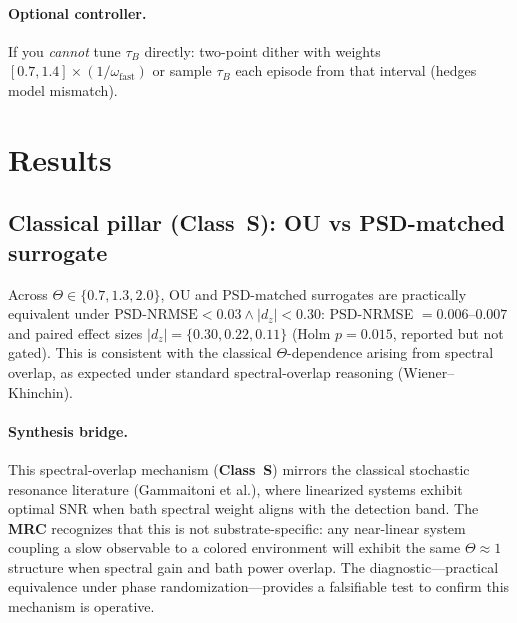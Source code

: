 \documentclass[11pt,letterpaper]{article}
\DeclareRobustCommand{\mrc}{\textbf{MRC}\xspace}
\DeclareRobustCommand{\classS}{\textbf{Class~S}\xspace}
\DeclareRobustCommand{\GatePSD}{\ensuremath{\text{PSD-NRMSE}<0.03}\xspace}
\DeclareRobustCommand{\GateDZ}{\ensuremath{\lvert d_z\rvert<0.30}\xspace}
\DeclareRobustCommand{\GateEQ}{\ensuremath{\GatePSD \wedge \GateDZ}\xspace}
\begin{document}
\begin{tcolorbox}[colback=blue!5!white,colframe=blue!75!black,title=Design Card: Memory-Resonance Condition ($\Theta \approx 1$)]
\paragraph*{Optional controller.}
If you \emph{cannot} tune $\tau_B$ directly: two-point dither with weights $[0.7, 1.4]\times(1/\omega_{\mathrm{fast}})$ or sample $\tau_B$ each episode from that interval (hedges model mismatch).

\end{tcolorbox}

\section{Results}
\subsection{Classical pillar (\classS): OU vs PSD-matched surrogate}
Across $\Theta\in\{0.7,1.3,2.0\}$, OU and PSD-matched surrogates are practically equivalent under \GateEQ: PSD-NRMSE $=0.006$--$0.007$ and paired effect sizes $|d_z|=\{0.30,0.22,0.11\}$ (Holm $p=0.015$, reported but not gated). This is consistent with the classical $\Theta$-dependence arising from spectral overlap, as expected under standard spectral-overlap reasoning (Wiener--Khinchin).

\paragraph*{Synthesis bridge.} This spectral-overlap mechanism (\classS) mirrors the classical stochastic resonance literature (Gammaitoni et al.), where linearized systems exhibit optimal SNR when bath spectral weight aligns with the detection band. The \mrc recognizes that this is not substrate-specific: any near-linear system coupling a slow observable to a colored environment will exhibit the same $\Theta\!\approx\!1$ structure when spectral gain and bath power overlap. The diagnostic---practical equivalence under phase randomization---provides a falsifiable test to confirm this mechanism is operative.
\end{document}
